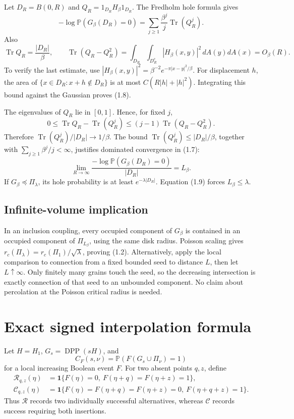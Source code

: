 \documentclass[11pt,a4paper]{article}
\theoremstyle{definition}
\theoremstyle{remark}
\numberwithin{equation}{section}
\begin{document}
Let \(D_R=B(0,R)\) and \(Q_R=1_{D_R}H_\beta1_{D_R}\). The Fredholm hole formula gives \[
-\log\mathbb P(G_\beta(D_R)=0)
 =\sum_{j\ge1}\frac{\beta^j}{j}\operatorname{Tr}(Q_R^j).
\tag{1.7}
\] Also \[
\operatorname{Tr}Q_R=\frac{|D_R|}{\beta},\qquad
\operatorname{Tr}(Q_R-Q_R^2)
 =\int_{D_R}\int_{D_R^c}|H_\beta(x,y)|^2\,dA(y)dA(x)
 =O_\beta(R).
\tag{1.8}
\] To verify the last estimate, use \(|H_\beta(x,y)|^2=\beta^{-2}e^{-\pi|x-y|^2/\beta}\). For displacement \(h\), the area of \(\{x\in D_R:x+h\notin D_R\}\) is at most \(C(R|h|+|h|^2)\). Integrating this bound against the Gaussian proves (1.8).

The eigenvalues of \(Q_R\) lie in \([0,1]\). Hence, for fixed \(j\), \[
0\le\operatorname{Tr}Q_R-\operatorname{Tr}(Q_R^j)
\le(j-1)\operatorname{Tr}(Q_R-Q_R^2).
\] Therefore \(\operatorname{Tr}(Q_R^j)/|D_R|\to1/\beta\). The bound \(\operatorname{Tr}(Q_R^j)\le|D_R|/\beta\), together with \(\sum_{j\ge1}\beta^j/j<\infty\), justifies dominated convergence in (1.7): \[
\lim_{R\to\infty}
\frac{-\log\mathbb P(G_\beta(D_R)=0)}{|D_R|}
=L_\beta.
\tag{1.9}
\] If \(G_\beta\preceq\Pi_\lambda\), its hole probability is at least \(e^{-\lambda|D_R|}\). Equation (1.9) forces \(L_\beta\le\lambda\).

\hypertarget{infinite-volume-implication}{%
\subsection{Infinite-volume implication}\label{infinite-volume-implication}}

In an inclusion coupling, every occupied component of \(G_\beta\) is contained in an occupied component of \(\Pi_{L_\beta}\), using the same disk radius. Poisson scaling gives \(r_c(\Pi_\lambda)=r_c(\Pi_1)/\sqrt\lambda\), proving (1.2). Alternatively, apply the local comparison to connection from a fixed bounded seed to distance \(L\), then let \(L\uparrow\infty\). Only finitely many grains touch the seed, so the decreasing intersection is exactly connection of that seed to an unbounded component. No claim about percolation at the Poisson critical radius is needed.

\hypertarget{exact-signed-interpolation-formula}{%
\section{Exact signed interpolation formula}\label{exact-signed-interpolation-formula}}

Let \(H=H_1\), \(G_s=\operatorname{DPP}(sH)\), and \[
C_F(s,\nu)=\mathbb P(F(G_s\cup\Pi_\nu)=1)
\] for a local increasing Boolean event \(F\). For two absent points \(q,z\), define \[
\begin{aligned}
\mathcal R_{q,z}(\eta)
 &=\mathbf1\{F(\eta)=0,\ F(\eta+q)=F(\eta+z)=1\},\\
\mathcal C_{q,z}(\eta)
 &=\mathbf1\{F(\eta)=F(\eta+q)=F(\eta+z)=0,\
                         F(\eta+q+z)=1\}.
\end{aligned}
\] Thus \(\mathcal R\) records two individually successful alternatives, whereas \(\mathcal C\) records success requiring both insertions.
\end{document}
